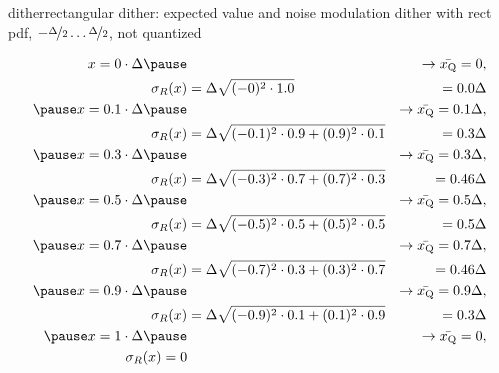 	\begin{frame}{dither}{rectangular dither: expected value and noise modulation}
        \vspace{-3mm}
        dither with rect pdf, $-\nicefrac{\Delta}{2}\ldots \nicefrac{\Delta}{2}$, not quantized
        \begin{footnotesize}
        \begin{eqnarray*}
               x = 0 \cdot \Delta \pause &&\rightarrow \bar{x_\mathrm{Q}} =0,\\ 
            \sigma_R(x) &= \Delta\sqrt{(-0)^2\cdot 1.0} &= 0.0\Delta\\
            \pause
            \smallskip
               x = 0.1 \cdot \Delta \pause &&\rightarrow \bar{x_\mathrm{Q}} = 0.1\Delta ,\\ 
            \sigma_R(x) &= \Delta\sqrt{(-0.1)^2\cdot0.9 + (0.9)^2\cdot0.1} &= 0.3\Delta \\ 
            \pause
            \smallskip
                x  = 0.3 \cdot \Delta \pause &&\rightarrow \bar{x_\mathrm{Q}}= 0.3\Delta ,\\ 
            \sigma_R(x) &= \Delta\sqrt{(-0.3)^2\cdot0.7 + (0.7)^2\cdot0.3} &= 0.46\Delta \\ 
            \pause
            \smallskip
               x  = 0.5 \cdot \Delta \pause &&\rightarrow \bar{x_\mathrm{Q}}= 0.5\Delta ,\\ 
            \sigma_R(x) &= \Delta\sqrt{(-0.5)^2\cdot0.5 + (0.5)^2\cdot0.5} &= 0.5\Delta \\ 
            \pause
            \smallskip
               x  = 0.7 \cdot \Delta \pause &&\rightarrow \bar{x_\mathrm{Q}}= 0.7\Delta ,\\ 
            \sigma_R(x) &= \Delta\sqrt{(-0.7)^2\cdot0.3 + (0.3)^2\cdot0.7} &= 0.46\Delta \\ 
            \pause
            \smallskip
               x  = 0.9 \cdot \Delta \pause &&\rightarrow \bar{x_\mathrm{Q}}= 0.9\Delta ,\\ 
            \sigma_R(x) &= \Delta\sqrt{(-0.9)^2\cdot0.1 + (0.1)^2\cdot0.9} &= 0.3\Delta \\ 
            \pause
            \smallskip
               x = 1 \cdot \Delta \pause &&\rightarrow \bar{x_\mathrm{Q}} =0,\\ 
            \sigma_R(x) = 0&&
        \end{eqnarray*}
        \end{footnotesize}
	\end{frame}	
